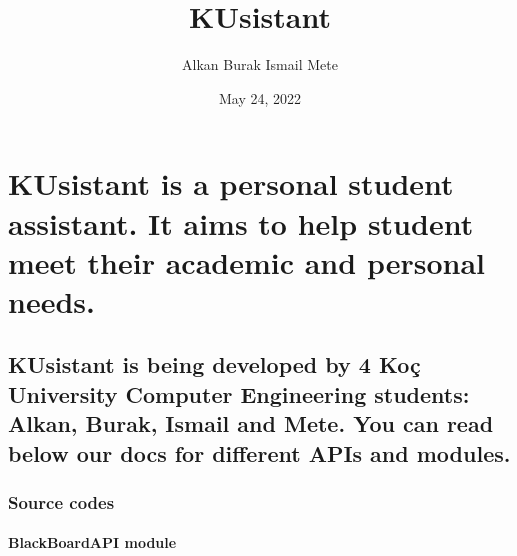 \documentclass[letterpaper,10pt,english]{sphinxmanual}
\title{KUsistant}
\date{May 24, 2022}
\author{Alkan Burak Ismail Mete}
\begin{document}
\pagestyle{empty}
\sphinxmaketitle
\pagestyle{plain}
\sphinxtableofcontents
\pagestyle{normal}
\label{\detokenize{index::doc}}



\chapter{KUsistant is a personal student assistant. It aims to help student meet their academic and personal needs.}
\label{\detokenize{index:kusistant-is-a-personal-student-assistant-it-aims-to-help-student-meet-their-academic-and-personal-needs}}

\section{KUsistant is being developed by 4 Koç University Computer Engineering students: Alkan, Burak, Ismail and Mete. You can read below our docs for different APIs and modules.}
\label{\detokenize{index:kusistant-is-being-developed-by-4-koc-university-computer-engineering-students-alkan-burak-ismail-and-mete-you-can-read-below-our-docs-for-different-apis-and-modules}}
\sphinxstepscope


\subsection{Source codes}
\label{\detokenize{modules:source-codes}}\label{\detokenize{modules::doc}}
\sphinxstepscope


\subsubsection{BlackBoardAPI module}
\label{\detokenize{BlackBoardAPI:module-BlackBoardAPI}}\label{\detokenize{BlackBoardAPI:blackboardapi-module}}\label{\detokenize{BlackBoardAPI::doc}}
\end{document}

